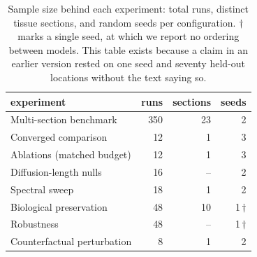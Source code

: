 \begin{table}[htbp]
\centering
\small
\caption{Sample size behind each experiment: total runs, distinct tissue sections, and random seeds per configuration. $\dagger$ marks a single seed, at which we report no ordering between models. This table exists because a claim in an earlier version rested on one seed and seventy held-out locations without the text saying so.}
\label{tab:samplesizes}
\begin{tabular}{lrrr}
\toprule
experiment & runs & sections & seeds\\
\midrule
Multi-section benchmark & 350 & 23 & 2 \\
Converged comparison & 12 & 1 & 3 \\
Ablations (matched budget) & 12 & 1 & 3 \\
Diffusion-length nulls & 16 & -- & 2 \\
Spectral sweep & 18 & 1 & 2 \\
Biological preservation & 48 & 10 & 1\,$\dagger$ \\
Robustness & 48 & -- & 1\,$\dagger$ \\
Counterfactual perturbation & 8 & 1 & 2 \\
\bottomrule
\end{tabular}
\end{table}
